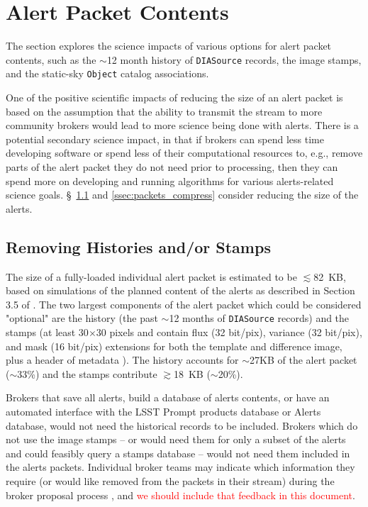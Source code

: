 \documentclass[DM,lsstdraft,authoryear,toc]{lsstdoc}
\begin{document}

\section{Alert Packet Contents} \label{sec:packets}

The section explores the science impacts of various options for alert packet contents, such as the $\sim$12 month history of {\tt DIASource} records, the image stamps, and the static-sky {\tt Object} catalog associations.

One of the positive scientific impacts of reducing the size of an alert packet is based on the assumption that the ability to transmit the stream to more community brokers would lead to more science being done with alerts. There is a potential secondary science impact, in that if brokers can spend less time developing software or spend less of their computational resources to, e.g., remove parts of the alert packet they do not need prior to processing, then they can spend more on developing and running algorithms for various alerts-related science goals. \S~\ref{ssec:packets_remove} and \ref{ssec:packets_compress} consider reducing the size of the alerts.


\subsection{Removing Histories and/or Stamps}\label{ssec:packets_remove}

The size of a fully-loaded individual alert packet is estimated to be $\lesssim$82~KB, based on simulations of the planned content of the alerts as described in Section 3.5 of . The two largest components of the alert packet which could be considered "optional" are the history (the past $\sim$12 months of {\tt DIASource} records) and the stamps (at least 30$\times$30 pixels and contain flux (32 bit/pix), variance (32 bit/pix), and mask (16 bit/pix) extensions for both the template and difference image, plus a header of metadata ). The history accounts for $\sim$27KB of the alert packet ($\sim$33\%) and the stamps contribute $\gtrsim$18~KB ($\sim$20\%). 

Brokers that save all alerts, build a database of alerts contents, or have an automated interface with the LSST Prompt products database or Alerts database, would not need the historical records to be included. Brokers which do not use the image stamps -- or would need them for only a subset of the alerts and could feasibly query a stamps database -- would not need them included in the alerts packets. Individual broker teams may indicate which information they require (or would like removed from the packets in their stream) during the broker proposal process , and \textcolor{red}{we should include that feedback in this document}.
\end{document}
